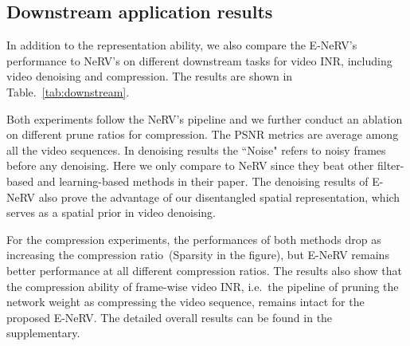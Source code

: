 \documentclass[runningheads]{llncs}
\begin{document}
\subsection{Downstream application results}
In addition to the representation ability, we also compare the E-NeRV's performance to NeRV's on different downstream tasks for video INR, including video denoising and compression. The results are shown in Table.~\ref{tab:downstream}. 

Both experiments follow the NeRV's pipeline and we further conduct an ablation on different prune ratios for compression. The PSNR metrics are average among all the video sequences. In denoising results the ``Noise" refers to noisy frames before any denoising. Here we only compare to NeRV since they beat other filter-based and learning-based methods in their paper. The denoising results of E-NeRV also prove the advantage of our disentangled spatial representation, which serves as a spatial prior in video denoising.

For the compression experiments, the performances of both methods drop as increasing the compression ratio~(Sparsity in the figure), but E-NeRV remains better performance at all different compression ratios. The results also show that the compression ability of frame-wise video INR, i.e.\ the pipeline of pruning the network weight as compressing the video sequence, remains intact for the proposed E-NeRV. The detailed overall results can be found in the supplementary.
\end{document}
